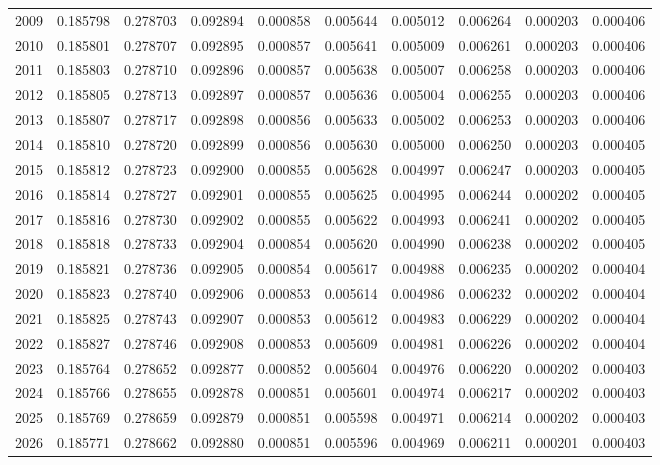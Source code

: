 \begin{tabular}{lrrrrrrrrr}
2009 & 0.185798 & 0.278703 & 0.092894 & 0.000858 & 0.005644 & 0.005012 & 0.006264 & 0.000203 & 0.000406 \\
2010 & 0.185801 & 0.278707 & 0.092895 & 0.000857 & 0.005641 & 0.005009 & 0.006261 & 0.000203 & 0.000406 \\
2011 & 0.185803 & 0.278710 & 0.092896 & 0.000857 & 0.005638 & 0.005007 & 0.006258 & 0.000203 & 0.000406 \\
2012 & 0.185805 & 0.278713 & 0.092897 & 0.000857 & 0.005636 & 0.005004 & 0.006255 & 0.000203 & 0.000406 \\
2013 & 0.185807 & 0.278717 & 0.092898 & 0.000856 & 0.005633 & 0.005002 & 0.006253 & 0.000203 & 0.000406 \\
2014 & 0.185810 & 0.278720 & 0.092899 & 0.000856 & 0.005630 & 0.005000 & 0.006250 & 0.000203 & 0.000405 \\
2015 & 0.185812 & 0.278723 & 0.092900 & 0.000855 & 0.005628 & 0.004997 & 0.006247 & 0.000203 & 0.000405 \\
2016 & 0.185814 & 0.278727 & 0.092901 & 0.000855 & 0.005625 & 0.004995 & 0.006244 & 0.000202 & 0.000405 \\
2017 & 0.185816 & 0.278730 & 0.092902 & 0.000855 & 0.005622 & 0.004993 & 0.006241 & 0.000202 & 0.000405 \\
2018 & 0.185818 & 0.278733 & 0.092904 & 0.000854 & 0.005620 & 0.004990 & 0.006238 & 0.000202 & 0.000405 \\
2019 & 0.185821 & 0.278736 & 0.092905 & 0.000854 & 0.005617 & 0.004988 & 0.006235 & 0.000202 & 0.000404 \\
2020 & 0.185823 & 0.278740 & 0.092906 & 0.000853 & 0.005614 & 0.004986 & 0.006232 & 0.000202 & 0.000404 \\
2021 & 0.185825 & 0.278743 & 0.092907 & 0.000853 & 0.005612 & 0.004983 & 0.006229 & 0.000202 & 0.000404 \\
2022 & 0.185827 & 0.278746 & 0.092908 & 0.000853 & 0.005609 & 0.004981 & 0.006226 & 0.000202 & 0.000404 \\
2023 & 0.185764 & 0.278652 & 0.092877 & 0.000852 & 0.005604 & 0.004976 & 0.006220 & 0.000202 & 0.000403 \\
2024 & 0.185766 & 0.278655 & 0.092878 & 0.000851 & 0.005601 & 0.004974 & 0.006217 & 0.000202 & 0.000403 \\
2025 & 0.185769 & 0.278659 & 0.092879 & 0.000851 & 0.005598 & 0.004971 & 0.006214 & 0.000202 & 0.000403 \\
2026 & 0.185771 & 0.278662 & 0.092880 & 0.000851 & 0.005596 & 0.004969 & 0.006211 & 0.000201 & 0.000403 \\

\end{tabular}
